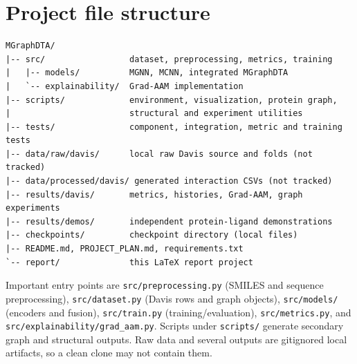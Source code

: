 \section{Project file structure}
\begin{lstlisting}
MGraphDTA/
|-- src/                 dataset, preprocessing, metrics, training
|   |-- models/          MGNN, MCNN, integrated MGraphDTA
|   `-- explainability/  Grad-AAM implementation
|-- scripts/             environment, visualization, protein graph,
|                        structural and experiment utilities
|-- tests/               component, integration, metric and training tests
|-- data/raw/davis/      local raw Davis source and folds (not tracked)
|-- data/processed/davis/ generated interaction CSVs (not tracked)
|-- results/davis/       metrics, histories, Grad-AAM, graph experiments
|-- results/demos/       independent protein-ligand demonstrations
|-- checkpoints/         checkpoint directory (local files)
|-- README.md, PROJECT_PLAN.md, requirements.txt
`-- report/              this LaTeX report project
\end{lstlisting}
Important entry points are \texttt{src/preprocessing.py} (SMILES and sequence preprocessing), \texttt{src/dataset.py} (Davis rows and graph objects), \texttt{src/models/} (encoders and fusion), \texttt{src/train.py} (training/evaluation), \texttt{src/metrics.py}, and \texttt{src/explainability/grad\_aam.py}. Scripts under \texttt{scripts/} generate secondary graph and structural outputs. Raw data and several outputs are gitignored local artifacts, so a clean clone may not contain them.

